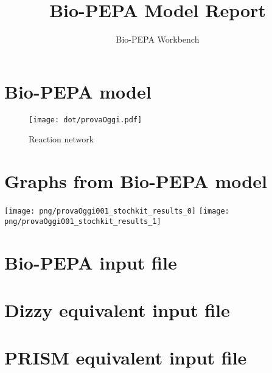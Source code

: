 \documentclass{llncs}
\title{Bio-PEPA Model Report}
\author{Bio-PEPA Workbench}
\institute{\today}
\begin{document}
\maketitle
\section{Bio-PEPA model}

\begin{figure}[htbp]
\begin{center}
\texttt{[image: dot/provaOggi.pdf]}
\caption{Reaction network}
\end{center}
\end{figure}
\newpage
\section{Graphs from Bio-PEPA model}
\texttt{[image: png/provaOggi001\_stochkit\_results\_0]}
\hfill
\texttt{[image: png/provaOggi001\_stochkit\_results\_1]}
\appendix
\newpage
\section{Bio-PEPA input file}

\newpage
\section{Dizzy equivalent input file}

\newpage
\section{PRISM equivalent input file}

\end{document}
